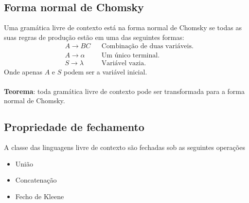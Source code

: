 \documentclass[11pt]{article}
\begin{document}
\subsection{Forma normal de Chomsky}
\label{sec:org8a7587d}
Uma gramática livre de contexto está na forma normal de Chomsky se todas as suas regras
de produção estão em uma das seguintes formas:
\begin{align*}
  & A \to BC && \text{Combinação de duas variáveis.} \\
  & A \to \alpha && \text{Um único terminal.} \\
  & S \to \lambda && \text{Variável vazia.}
\end{align*}
Onde apenas \(A\) e \(S\) podem ser a variável inicial. \\ \\
\textbf{Teorema}: toda gramática livre de contexto pode ser transformada para a forma normal
de Chomsky.
\subsection{Propriedade de fechamento}
\label{sec:orge800bd2}
A classe das linguagens livre de contexto são fechadas sob as seguintes operações
\begin{itemize}[itemsep=0pt]
\item União
\item Concatenação
\item Fecho de Kleene
\end{itemize}
\pagebreak
\end{document}
